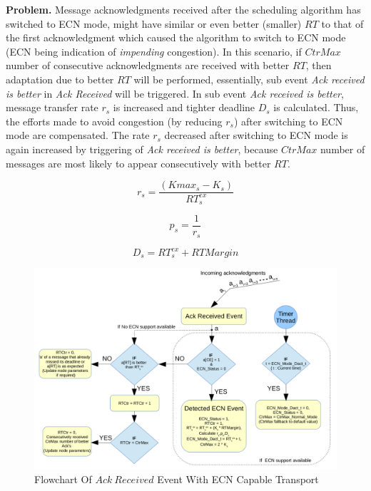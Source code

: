 {\bf Problem. }Message acknowledgments received after the scheduling algorithm has switched to ECN mode, might have similar or even better (smaller) $RT$ to that of the first acknowledgment which caused the algorithm to switch to ECN mode (ECN being indication of \textit{impending} congestion). In this scenario, if $CtrMax$ number of consecutive acknowledgments are received with better $RT$, then adaptation due to better $RT$ will be performed, essentially, sub event \textit{Ack received is better} in \textit{Ack Received} will be triggered. In sub event \textit{Ack received is better}, message transfer rate $r_s$ is increased and tighter deadline $D_s$ is calculated. Thus, the efforts made to avoid congestion (by reducing $r_s$) after switching to ECN mode are compensated. The rate $r_s$ decreased after switching to ECN mode is again increased by triggering of \textit{Ack received is better}, because $CtrMax$ number of messages are most likely to appear consecutively with better $RT$. 


\begin{equation}
r_s = \frac{(Kmax_s - K_s)}{RT_s^{ex}} 
\label{rate-eq}
\end{equation}	

\begin{equation}
p_s = \frac{1}{r_s}
\label{period-eq}
\end{equation}

\begin{equation}
D_s = RT_s^{ex} + RTMargin
\label{deadline-eq}
\end{equation}

\begin{figure}[htb]
  \begin{center}
    \includegraphics[scale=0.34]{Figures/iccps2014/ECN_flow.png}
  \caption{Flowchart Of $Ack ~Received$ Event With ECN Capable Transport}
  \label{fig:ECN_flow}
  \end{center}
\end{figure}

